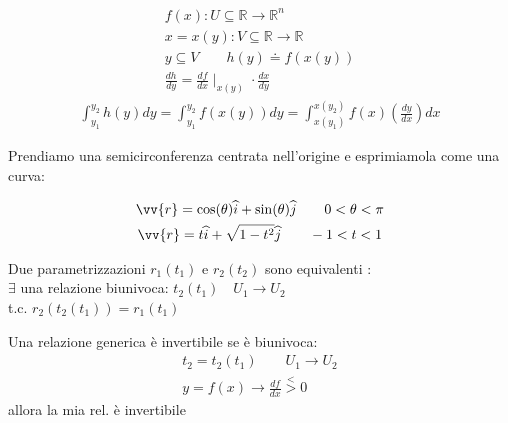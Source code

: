 \documentclass[a4paper, oneside]{article}
\begin{document}
\begin{proposition}
    \begin{gather*}
        f(x) : U \subseteq \mathbb{R} \to \mathbb{R}^n\\
        x = x(y) : V \subseteq \mathbb{R} \to \mathbb{R}\\
        y \subseteq V \qquad h(y) \doteq f(x(y))\\
        \frac{dh}{dy} = \frac{df}{dx} \mid_{x(y)}  \cdot \frac{dx}{dy}
    \end{gather*}
    \begin{gather*}
        \int_{y_1}^{y_2} h(y) dy = \int_{y_1}^{y_2} f(x(y)) dy = \int_{x(y_1)}^{x(y_2)} f(x) (\frac{dy}{dx}) dx
    \end{gather*}
\end{proposition}
\begin{example}
    Prendiamo una semicirconferenza centrata nell'origine e esprimiamola come una curva:
    \begin{gather*}
        \vv{r} = \cos(\theta) \widehat{i} + \sin(\theta) \widehat{j}\qquad 0 < \theta < \pi \\
        \vv{r} = t \widehat{i} + \sqrt{1-t^2} \widehat{j} \qquad -1 < t < 1
    \end{gather*}
\end{example}
    \noindent
    \begin{proposition}
        Due parametrizzazioni $r_1(t_1)$ e $r_2(t_2)$ sono equivalenti :\\
        $\exists$ una relazione biunivoca: $t_2(t_1) \quad U_1 \to U_2$ \\
        t.c. $r_2(t_2(t_1)) = r_1(t_1)$
    \end{proposition}
    \begin{proposition}
        Una relazione generica è invertibile se è biunivoca:
        \begin{gather*}
            t_2 = t_2(t_1) \qquad U_1 \to U_2\\
            y = f(x) \to \frac{df}{dx} \overset{<}{>} 0
        \end{gather*}
        allora la mia rel. è invertibile
    \end{proposition}
\end{document}
